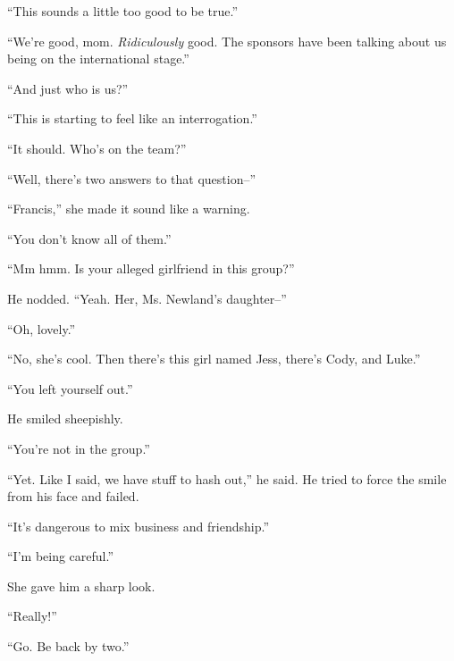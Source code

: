 ``This sounds a little too good to be true.''



``We're good, mom.  \emph{Ridiculously} good.  The sponsors have been talking about us being on the international stage.''



``And just who is us?''



``This is starting to feel like an interrogation.''



``It should.  Who's on the team?''



``Well, there's two answers to that question--''



``Francis,'' she made it sound like a warning.



``You don't know all of them.''



``Mm hmm.  Is your alleged girlfriend in this group?''



He nodded.  ``Yeah.  Her, Ms. Newland's daughter--''



``Oh, lovely.''



``No, she's cool.  Then there's this girl named Jess, there's Cody, and Luke.''



``You left yourself out.''



He smiled sheepishly.



``You're not in the group.''



``Yet.  Like I said, we have stuff to hash out,'' he said.  He tried to force the smile from his face and failed.



``It's dangerous to mix business and friendship.''



``I'm being careful.''



She gave him a sharp look.



``Really!''



``Go.  Be back by two.''



